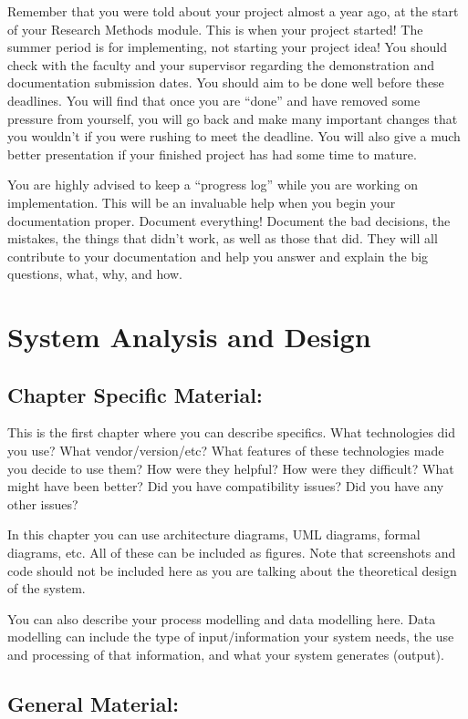 \documentclass{report}[a4paper,12pt,onecolumn]
\begin{document}
Remember that you were told about your project almost a year ago, at the start 
of your Research Methods module. This is when your project started! The summer 
period is for implementing, not starting your project idea! You should check 
with the faculty and your supervisor regarding the demonstration and 
documentation submission dates. You should aim to be done well before these 
deadlines. You will find that once you are ``done'' and have removed some 
pressure from yourself, you will go back and make many important changes that 
you wouldn't if you were rushing to meet the deadline. You will also give a 
much better presentation if your finished project has had some time to mature.

You are highly advised to keep a ``progress log'' while you are working on 
implementation. This will be an invaluable help when you begin your 
documentation proper. Document everything! Document the bad decisions, the 
mistakes, the things that didn't work, as well as those that did. They will all 
contribute to your documentation and help you answer and explain the big 
questions, what, why, and how.

\chapter{System Analysis and Design}

\section{Chapter Specific Material:}

This is the first chapter where you can describe specifics. What technologies 
did you use? What vendor/version/etc? What features of these technologies made 
you decide to use them? How were they helpful? How were they difficult? What 
might have been better? Did you have compatibility issues? Did you have any 
other issues?

In this chapter you can use architecture diagrams, UML diagrams, formal 
diagrams, etc. All of these can be included as figures. Note that screenshots 
and code should not be included here as you are talking about the theoretical 
design of the system.

You can also describe your process modelling and data modelling here. Data 
modelling can include the type of input/information your system needs, the use 
and processing of that information, and what your system generates (output).

\section{General Material:}
\end{document}
